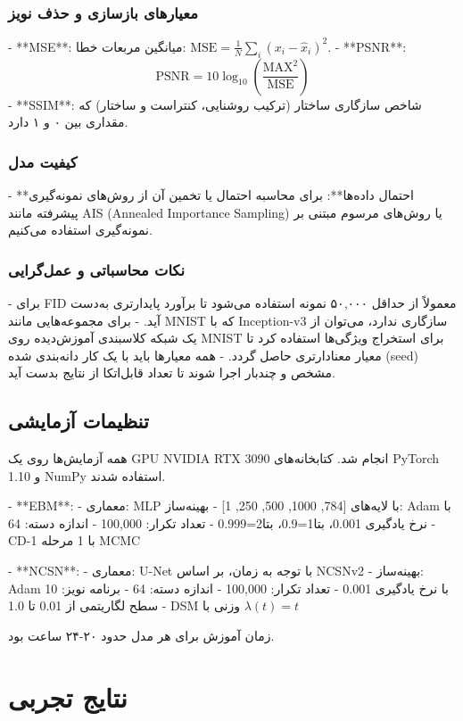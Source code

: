 \subsubsection{معیارهای بازسازی و حذف نویز}
- **MSE**: میانگین مربعات خطا: \(\mathrm{MSE} = \frac{1}{N} \sum_i (x_i - \hat{x}_i)^2\).
- **PSNR**: 
\[
\mathrm{PSNR} = 10 \log_{10} \left( \frac{\mathrm{MAX}^2}{\mathrm{MSE}} \right)
\]
- **SSIM**: شاخص سازگاری ساختار (ترکیب روشنایی، کنتراست و ساختار) که مقداری بین ۰ و ۱ دارد.

\subsubsection{کیفیت مدل}
- **احتمال داده‌ها**: برای محاسبه احتمال یا تخمین آن از روش‌های نمونه‌گیری پیشرفته مانند AIS (Annealed Importance Sampling) یا روش‌های مرسوم مبتنی بر نمونه‌گیری استفاده می‌کنیم.

\subsubsection{نکات محاسباتی و عمل‌گرایی}
- برای FID معمولاً از حداقل ۵۰,۰۰۰ نمونه استفاده می‌شود تا برآورد پایدارتری به‌دست آید.
- برای مجموعه‌هایی مانند MNIST که با Inception-v3 سازگاری ندارد، می‌توان از یک شبکه کلاسبندی آموزش‌دیده روی MNIST برای استخراج ویژگی‌ها استفاده کرد تا معیار معنادارتری حاصل گردد.
- همه معیارها باید با یک کار دانه‌بندی شده (seed) مشخص و چندبار اجرا شوند تا تعداد قابل‌اتکا از نتایج بدست آید.

\subsection{تنظیمات آزمایشی}
همه آزمایش‌ها روی یک GPU NVIDIA RTX 3090 انجام شد. کتابخانه‌های PyTorch 1.10 و NumPy استفاده شدند.

- **EBM**:
  - معماری: MLP با لایه‌های [784, 1000, 500, 250, 1]
  - بهینه‌ساز: Adam با نرخ یادگیری 0.001، بتا1=0.9، بتا2=0.999
  - تعداد تکرار: 100,000
  - اندازه دسته: 64
  - CD-1 با 1 مرحله MCMC

- **NCSN**:
  - معماری: U-Net با توجه به زمان، بر اساس NCSNv2
  - بهینه‌ساز: Adam با نرخ یادگیری 0.001
  - تعداد تکرار: 100,000
  - اندازه دسته: 64
  - برنامه نویز: 10 سطح لگاریتمی از 0.01 تا 1.0
  - DSM وزنی با \(\lambda(t) = t\)

زمان آموزش برای هر مدل حدود ۲۰-۲۴ ساعت بود.

\section{نتایج تجربی}
